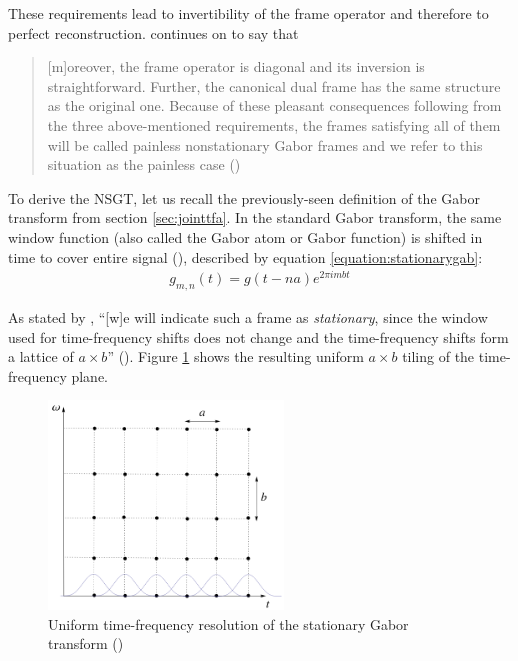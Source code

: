 \documentclass[report.tex]{subfiles}
\begin{document}
These requirements lead to invertibility of the frame operator and therefore to perfect reconstruction. \citeauthor{balazs} continues on to say that

\begin{quote}
	[m]oreover, the frame operator is diagonal and its inversion is straightforward. Further, the canonical dual frame has the same structure as the original one. Because of these pleasant consequences following from the three above-mentioned requirements, the frames satisfying all of them will be called painless nonstationary Gabor frames and we refer to this situation as the painless case (\cite[1482]{balazs})
\end{quote}

To derive the NSGT, let us recall the previously-seen definition of the Gabor transform from section \ref{sec:jointtfa}. In the standard Gabor transform, the same window function (also called the Gabor atom or Gabor function) is shifted in time to cover entire signal (\cite{adaptivecqt}), described by equation \eqref{equation:stationarygab}:
\begin{align} \tag{10}\label{equation:stationarygab}
g_{m, n}(t) = g(t - na)e^{2\pi i m b t}
\end{align}

As stated by \citeauthor{adaptivecqt}, ``[w]e will indicate such a frame as \textit{stationary}, since the window used for time-frequency shifts does not change and the time-frequency shifts form a lattice of $a \times b$'' (\cite[3]{adaptivecqt}). Figure \ref{fig:uniformtflattice} shows the resulting uniform $a \times b$ tiling of the time-frequency plane.

\begin{figure}[ht]
	\centering
	\includegraphics[width=6.25cm]{./images-tftheory/stationarygabor.png}
	\caption{Uniform time-frequency resolution of the stationary Gabor transform (\cite[3]{adaptivecqt})}
	\label{fig:uniformtflattice}
\end{figure}
\end{document}
